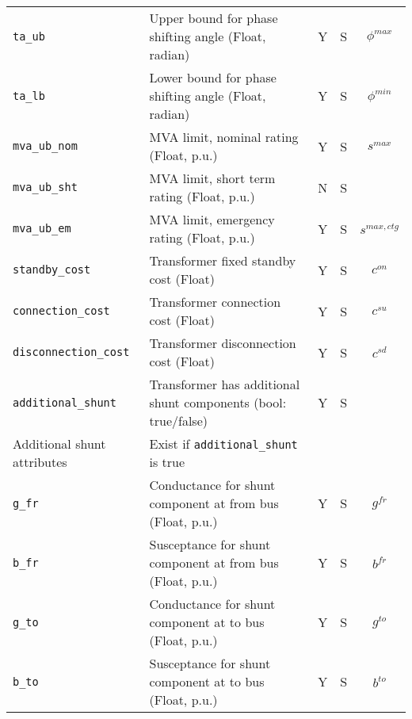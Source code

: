 \documentclass{article}
\begin{document}
\begin{center}
\begin{tabular}{ l | l | c | c | c |}
  {\tt ta\_ub} & Upper bound for phase shifting angle (Float, radian)& Y & S & $\phi^{max}$\\
  {\tt ta\_lb} & Lower bound for phase shifting angle (Float, radian)& Y & S & $\phi^{min}$\\
  {\tt mva\_ub\_nom} & MVA limit, nominal rating (Float, p.u.) & Y & S & $s^{max}$ \\
  {\tt mva\_ub\_sht} & MVA limit, short term rating (Float, p.u.) & N & S &  \\
  {\tt mva\_ub\_em} & MVA limit, emergency rating (Float, p.u.) & Y & S & $s^{max,ctg}$ \\

  {\tt standby\_cost} & Transformer fixed standby cost (Float) & Y & S & $c^{on}$\\
  {\tt connection\_cost} &  Transformer connection cost (Float) & Y & S & $c^{su}$\\
  {\tt disconnection\_cost} & Transformer disconnection cost (Float) & Y & S & $c^{sd}$\\
  {\tt additional\_shunt} & Transformer has additional shunt components (bool: true/false)& Y & S & \\
  \hline
  Additional shunt attributes & Exist if {\tt additional\_shunt} is true &  & & \\
  \hline
  {\tt g\_fr} & Conductance for shunt component at from bus (Float, p.u.)& Y & S & $g^{fr}$\\
  {\tt b\_fr} & Susceptance for shunt component at from bus (Float, p.u.)& Y & S & $b^{fr}$\\
  {\tt g\_to} & Conductance for shunt component at to bus (Float, p.u.)& Y & S & $g^{to}$\\
  {\tt b\_to} & Susceptance for shunt component at to bus (Float, p.u.)& Y & S & $b^{to}$\\
  \hline
\end{tabular}
\end{center}
\end{document}
